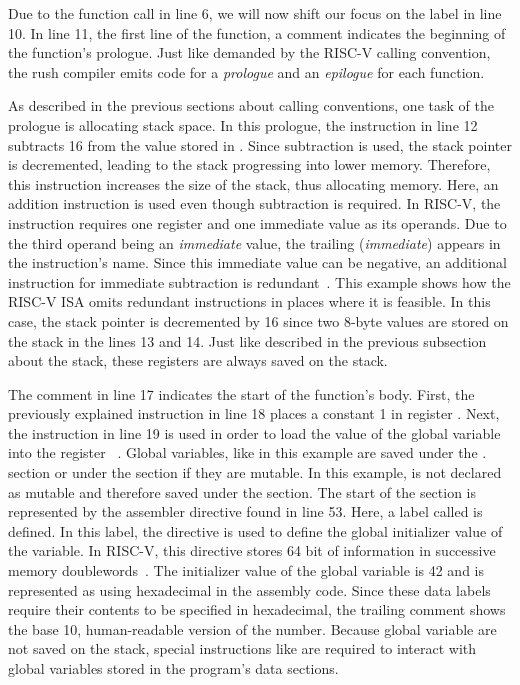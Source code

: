 Due to the function call in line 6, we will now shift our focus on the  label in line 10.
In line 11, the first line of the  function, a comment indicates the beginning of the function's prologue.
Just like demanded by the RISC-V calling convention, the rush compiler emits code for a \emph{prologue} and an \emph{epilogue} for each function.

As described in the previous sections about calling conventions, one task of the prologue is allocating stack space.
In this prologue, the  instruction in line 12 subtracts 16 from the value stored in .
Since subtraction is used, the stack pointer is decremented, leading to the stack progressing into lower memory.
Therefore, this instruction increases the size of the stack, thus allocating memory.
Here, an addition instruction is used even though subtraction is required.
In RISC-V, the  instruction requires one register and one immediate value as its operands.
Due to the third operand being an \emph{immediate} value, the trailing  (\emph{immediate}) appears in the instruction's name.
Since this immediate value can be negative, an additional instruction for immediate subtraction is redundant~\cite[reference]{Patterson2017}.
This example shows how the RISC-V ISA omits redundant instructions in places where it is feasible.
In this case, the stack pointer is decremented by 16 since two 8-byte values are stored on the stack in the lines 13 and 14.
Just like described in the previous subsection about the stack, these registers are always saved on the stack.

The comment in line 17 indicates the start of the function's body.
First, the previously explained  instruction in line 18 places a constant 1 in register .
Next, the  instruction in line 19 is used in order to load the value of the global variable  into the register ~\cite[reference]{Patterson2017}.
Global variables, like  in this example are saved under the . section or under the  section if they are mutable.
In this example,  is not declared as mutable and therefore saved under the  section.
The start of the  section is represented by the  assembler directive found in line 53.
Here, a label called  is defined.
In this label, the  directive is used to define the global initializer value of the variable.
In RISC-V, this directive stores 64 bit of information in successive memory doublewords~\cite[p.~39]{Patterson2017}.
The initializer value of the global variable is 42 and is represented as  using hexadecimal in the assembly code.
Since these data labels require their contents to be specified in hexadecimal, the trailing comment shows the base 10, human-readable version of the number.
Because global variable are not saved on the stack, special instructions like  are required to interact with global variables stored in the program's data sections.

